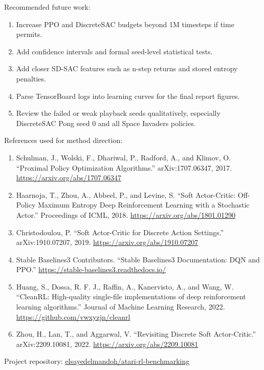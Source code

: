 \documentclass[11pt]{article}
\begin{document}
Recommended future work:

\begin{enumerate}
\item Increase PPO and DiscreteSAC budgets beyond 1M timesteps if time permits.
\item Add confidence intervals and formal seed-level statistical tests.
\item Add closer SD-SAC features such as n-step returns and stored entropy penalties.
\item Parse TensorBoard logs into learning curves for the final report figures.
\item Review the failed or weak playback seeds qualitatively, especially DiscreteSAC Pong seed 0 and all Space Invaders policies.
\end{enumerate}

References used for method direction:

\begin{enumerate}
\item Schulman, J., Wolski, F., Dhariwal, P., Radford, A., and Klimov, O. ``Proximal Policy Optimization Algorithms.'' arXiv:1707.06347, 2017. \url{https://arxiv.org/abs/1707.06347}
\item Haarnoja, T., Zhou, A., Abbeel, P., and Levine, S. ``Soft Actor-Critic: Off-Policy Maximum Entropy Deep Reinforcement Learning with a Stochastic Actor.'' Proceedings of ICML, 2018. \url{https://arxiv.org/abs/1801.01290}
\item Christodoulou, P. ``Soft Actor-Critic for Discrete Action Settings.'' arXiv:1910.07207, 2019. \url{https://arxiv.org/abs/1910.07207}
\item Stable Baselines3 Contributors. ``Stable Baselines3 Documentation: DQN and PPO.'' \url{https://stable-baselines3.readthedocs.io/}
\item Huang, S., Dossa, R. F. J., Raffin, A., Kanervisto, A., and Wang, W. ``CleanRL: High-quality single-file implementations of deep reinforcement learning algorithms.'' Journal of Machine Learning Research, 2022. \url{https://github.com/vwxyzjn/cleanrl}
\item Zhou, H., Lan, T., and Aggarwal, V. ``Revisiting Discrete Soft Actor-Critic.'' arXiv:2209.10081, 2022. \url{https://arxiv.org/abs/2209.10081}
\end{enumerate}

Project repository: \href{https://github.com/elsayedelmandoh/atari-rl-benchmarking}{elsayedelmandoh/atari-rl-benchmarking}
\end{document}

